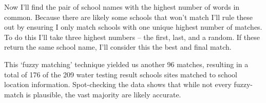 \documentclass[
]{article}
\newenvironment{Shaded}{\begin{snugshade}}{\end{snugshade}}
\newcommand{\AttributeTok}[1]{\textcolor[rgb]{0.77,0.63,0.00}{#1}}
\newcommand{\CommentTok}[1]{\textcolor[rgb]{0.56,0.35,0.01}{\textit{#1}}}
\newcommand{\ConstantTok}[1]{\textcolor[rgb]{0.00,0.00,0.00}{#1}}
\newcommand{\DecValTok}[1]{\textcolor[rgb]{0.00,0.00,0.81}{#1}}
\newcommand{\FunctionTok}[1]{\textcolor[rgb]{0.00,0.00,0.00}{#1}}
\newcommand{\NormalTok}[1]{#1}
\newcommand{\OtherTok}[1]{\textcolor[rgb]{0.56,0.35,0.01}{#1}}
\newcommand{\SpecialCharTok}[1]{\textcolor[rgb]{0.00,0.00,0.00}{#1}}
\newcommand{\StringTok}[1]{\textcolor[rgb]{0.31,0.60,0.02}{#1}}
\begin{document}
Now I'll find the pair of school names with the highest number of words
in common. Because there are likely some schools that won't match I'll
rule these out by ensuring I only match schools with one unique highest
number of matches. To do this I'll take three highest numbers -- the
first, last, and a random. If these return the same school name, I'll
consider this the best and final match.

\begin{Shaded}
\end{Shaded}

This `fuzzy matching' technique yielded us another 96 matches, resulting
in a total of 176 of the 209 water testing result schools sites matched
to school location information. Spot-checking the data shows that while
not every fuzzy-match is plausible, the vast majority are likely
accurate.
\end{document}
